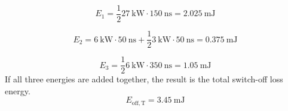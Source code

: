 \begin{solutionblock}
   \begin{equation}
    E_{\mathrm{1}} = \frac{1}{2} \SI{27}{\kilo\watt} \cdot \SI{150}{\ns} = \SI {2.025}{\milli\joule}
   \end{equation}

   \begin{equation}
    E_{\mathrm{2}} = \SI{6}{\kilo\watt} \cdot \SI{50}{\ns} + \frac{1}{2} \SI{3}{\kilo\watt} \cdot \SI{50}{\ns} = \SI {0.375}{\milli\joule}
    \end{equation}

    \begin{equation}
     E_{\mathrm{3}} = \frac{1}{2} \SI{6}{\kilo\watt} \cdot \SI{350}{\ns} = \SI {1.05}{\milli\joule}
     \end{equation}
     If all three energies are added together, the result is the total switch-off loss energy.
     \begin{equation}
        E_{\mathrm{off,T}} =  \SI {3.45}{\milli\joule}
     \end{equation}


\end{solutionblock}
